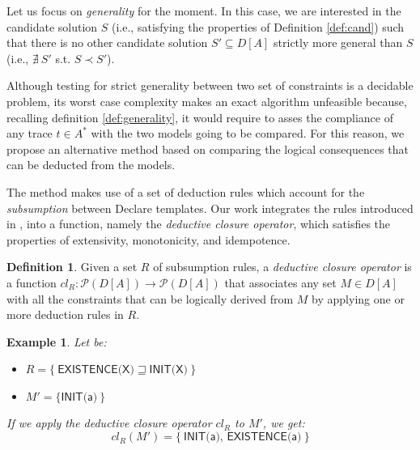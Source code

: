 \documentclass[a4wide,11pt]{article}
\newcommand{\tcolor}[2]{\color{#1}{#2}\color{black}}
\theoremstyle{definition}
\newtheorem{definition}{Definition}[section]
\theoremstyle{plain}
\newtheorem{example}{Example}[section]
\begin{document}

Let us focus on \emph{generality} for the moment. In this case, we are interested in the candidate solution $S$ (i.e., satisfying the properties of Definition \ref{def:cand}) such that there is no other candidate solution $S'\subseteq D[A]$  strictly more general than $S$ (i.e., $\nexists~ S'$ s.t. $S\prec S'$).


Although testing for strict generality between two set of constraints is a decidable problem, its worst case complexity makes an exact algorithm unfeasible because, recalling definition \ref{def:generality}, it would require to asses the compliance of any trace $t \in A^*$ with the two models going to be compared.
For this reason, we propose an alternative method based on comparing the logical consequences that can be deducted from the models.

The method makes use of a set of deduction rules which account for the \emph{subsumption} between Declare templates. Our work integrates the rules introduced in \cite{2017-DiCiccio}, into a function, namely the \emph{deductive closure operator}, which satisfies the properties of extensivity, monotonicity, and idempotence.


\theoremstyle{definition}\label{def:closure}
\begin{definition}{}
Given a set $R$ of subsumption rules, a \emph{deductive closure operator} is a function $cl_R: \mathcal{P}(D[A])\rightarrow\mathcal{P}(D[A])$ that associates any set $M \in D[A]$ with all the constraints that can be logically derived from $M$ by applying one or more deduction rules in $R$.
\end{definition}

\begin{example}
Let be:
\begin{itemize}
\item $R=\{\ \textsf{EXISTENCE(X)} \sqsupseteq \textsf{INIT(X)}\ \}$
\item $M'=\{ \textsf{INIT(a)}\ \}$
\end{itemize}
If we apply the deductive closure operator $cl_R$ to $M'$, we get:
$$
cl_R(M') = \{\ \textsf{INIT(a), EXISTENCE(a)}\ \}
$$
\end{example}
\end{document}
